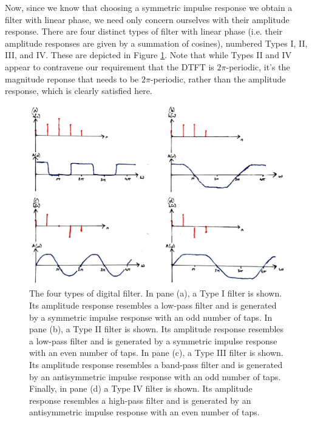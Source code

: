 Now, since we know that choosing a symmetric impulse response we obtain a filter
with linear phase, we need only concern ourselves with their amplitude response.
There are four distinct types of filter with linear phase (i.e. their amplitude
responses are given by a summation of cosines), numbered Types I, II, III, and IV.
These are depicted in Figure \ref{fig::lecture_16_filter_types}.
Note that while Types II and IV appear to
contravene our requirement that the DTFT is $2\pi$-periodic, it's the magnitude
reponse that needs to be $2\pi$-periodic, rather than the amplitude response, which
is clearly satisfied here.\\
%
\begin{figure}[!htb]
  \includegraphics[width=\textwidth]{images/lecture_16_filter_Types.JPG}
  \caption{The four types of digital filter. In pane (a), a Type I filter
    is shown. Its amplitude response resembles a low-pass filter and is
    generated by a symmetric impulse response with an odd number of taps. In pane (b),
    a Type II filter is shown. Its amplitude response resembles a low-pass filter
    and is generated by a symmetric impulse response with an even number of taps.
    In pane (c), a Type III filter is shown. Its amplitude response resembles
    a band-pass filter and is generated by an antisymmetric impulse response
    with an odd number of taps. Finally, in pane (d) a Type IV filter is
    shown. Its amplitude response resembles a high-pass filter  and is generated
    by an antisymmetric impulse response with an even number of taps.
  }
  \label{fig::lecture_16_filter_types}
\end{figure}

